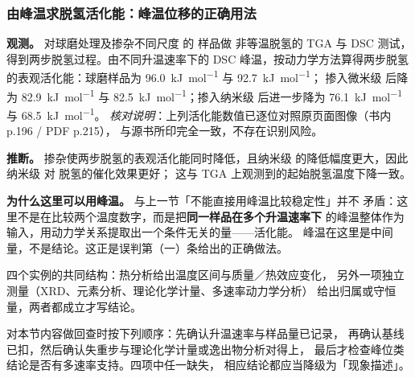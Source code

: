 \subsubsection{由峰温求脱氢活化能：峰温位移的正确用法}

\begin{dataflow}
\textbf{观测。} 对球磨处理及掺杂不同尺度  的  样品做
非等温脱氢的 TGA 与 DSC 测试，得到两步脱氢过程。由不同升温速率下的 DSC
峰温，按动力学方法算得两步脱氢的表观活化能：球磨样品为
\qty{96.0}{kJ.mol^{-1}} 与 \qty{92.7}{kJ.mol^{-1}}；
掺入微米级  后降为 \qty{82.9}{kJ.mol^{-1}} 与
\qty{82.5}{kJ.mol^{-1}}；掺入纳米级  后进一步降为
\qty{76.1}{kJ.mol^{-1}} 与 \qty{68.5}{kJ.mol^{-1}}。
\emph{核对说明}：上列活化能数值已逐位对照原页面图像（书内 p.196 / PDF p.215），
与源书所印完全一致，不存在识别风险。

\textbf{推断。} 掺杂使两步脱氢的表观活化能同时降低，且纳米级 
的降低幅度更大，因此纳米级  对  脱氢的催化效果更好；
这与 TGA 上观测到的起始脱氢温度下降一致。

\textbf{为什么这里可以用峰温。} 与上一节「不能直接用峰温比较稳定性」并不
矛盾：这里不是在比较两个温度数字，而是把\textbf{同一样品在多个升温速率下}
的峰温整体作为输入，用动力学关系提取出一个条件无关的量——活化能。
峰温在这里是中间量，不是结论。这正是误判第（一）条给出的正确做法。
\end{dataflow}

\begin{crosscheck}
四个实例的共同结构：热分析给出温度区间与质量／热效应变化，
另外一项独立测量（XRD、元素分析、理论化学计量、多速率动力学分析）
给出归属或守恒量，两者都成立才写结论。

对本节内容做回查时按下列顺序：先确认升温速率与样品量已记录，
再确认基线已扣，然后确认失重步与理论化学计量或逸出物分析对得上，
最后才检查峰位类结论是否有多速率支持。四项中任一缺失，
相应结论都应当降级为「现象描述」。

\end{crosscheck}
